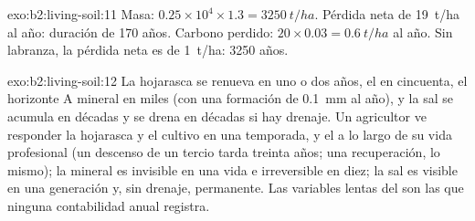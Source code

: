 \begin{solution}{exo:b2:living-soil:11}
Masa: $0.25\times 10^{4}\times 1.3 = \qty{3250}{t/ha}$. Pérdida neta de
\qty{19}{t/ha} al año: duración de 170 años. Carbono perdido: $20\times
0.03 = \qty{0.6}{t/ha}$ al año. Sin labranza, la pérdida neta es de
\qty{1}{t/ha}: 3250 años.
\end{solution}

\begin{solution}{exo:b2:living-soil:12}
La hojarasca se renueva en uno o dos años, el  en cincuenta, el
horizonte A mineral en miles (con una formación de \qty{0.1}{mm} al año), y
la sal se acumula en décadas y se drena en décadas si hay drenaje. Un
agricultor ve responder la hojarasca y el cultivo en una temporada, y el
 a lo largo de su vida profesional (un descenso de un tercio tarda
treinta años; una recuperación, lo mismo); la  mineral es
invisible en una vida e irreversible en diez; la sal es visible en una
generación y, sin drenaje, permanente. Las variables lentas del  son
las que ninguna contabilidad anual registra.
\end{solution}


